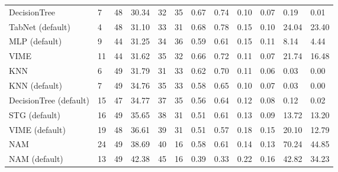 \begin{tabular}{lllllrllllll}
DecisionTree & 7 & 48 & 30.34 & 32 & 35 & 0.67 & 0.74 & 0.10 & 0.07 & 0.19 & 0.01 \\
TabNet (default) & 4 & 48 & 31.10 & 33 & 31 & 0.68 & 0.78 & 0.15 & 0.10 & 24.04 & 23.40 \\
MLP (default) & 9 & 44 & 31.25 & 34 & 36 & 0.59 & 0.61 & 0.15 & 0.11 & 8.14 & 4.44 \\
VIME & 11 & 44 & 31.62 & 35 & 32 & 0.66 & 0.72 & 0.11 & 0.07 & 21.74 & 16.48 \\
KNN & 6 & 49 & 31.79 & 31 & 33 & 0.62 & 0.70 & 0.11 & 0.06 & 0.03 & 0.00 \\
KNN (default) & 7 & 49 & 34.76 & 35 & 33 & 0.58 & 0.65 & 0.10 & 0.07 & 0.03 & 0.00 \\
DecisionTree (default) & 15 & 47 & 34.77 & 37 & 35 & 0.56 & 0.64 & 0.12 & 0.08 & 0.12 & 0.02 \\
STG (default) & 16 & 49 & 35.65 & 38 & 31 & 0.51 & 0.61 & 0.13 & 0.09 & 13.72 & 13.20 \\
VIME (default) & 19 & 48 & 36.61 & 39 & 31 & 0.51 & 0.57 & 0.18 & 0.15 & 20.10 & 12.79 \\
NAM & 24 & 49 & 38.69 & 40 & 16 & 0.58 & 0.61 & 0.14 & 0.13 & 70.24 & 44.85 \\
NAM (default) & 13 & 49 & 42.38 & 45 & 16 & 0.39 & 0.33 & 0.22 & 0.16 & 42.82 & 34.23 \\
\bottomrule
\end{tabular}
